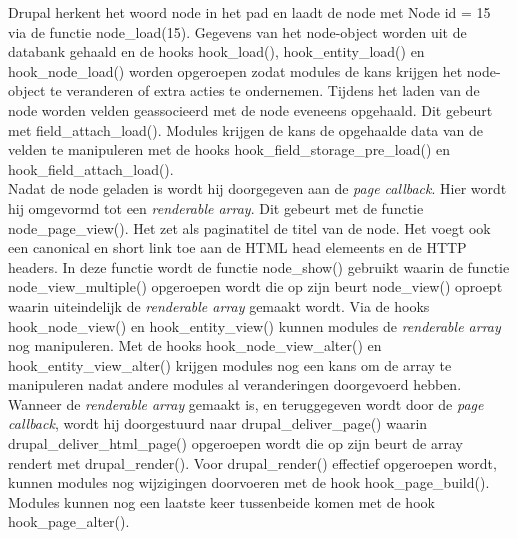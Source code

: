 Drupal herkent het woord node in het pad en laadt de node met Node id = 15 via de functie node\_load(15). Gegevens van het node-object worden uit de databank gehaald en de hooks hook\_load(), hook\_entity\_load() en hook\_node\_load() worden opgeroepen zodat modules de kans krijgen het node-object te veranderen of extra acties te ondernemen. Tijdens het laden van de node worden velden geassocieerd met de node eveneens opgehaald. Dit gebeurt met field\_attach\_load(). Modules krijgen de kans de opgehaalde data van de velden te manipuleren met de hooks hook\_field\_storage\_pre\_load() en hook\_field\_attach\_load().\\

Nadat de node geladen is wordt hij doorgegeven aan de \textit{page callback}. Hier wordt hij omgevormd tot een \textit{renderable array}. Dit gebeurt met de functie node\_page\_view(). Het zet als paginatitel de titel van de node. Het voegt ook een canonical en short link toe aan de HTML head elemeents en de HTTP headers. In deze functie wordt de functie node\_show() gebruikt waarin de functie node\_view\_multiple() opgeroepen wordt die op zijn beurt node\_view() oproept waarin uiteindelijk de \textit{renderable array} gemaakt wordt. Via de hooks hook\_node\_view() en hook\_entity\_view() kunnen modules de \textit{renderable array} nog manipuleren. Met de hooks hook\_node\_view\_alter() en hook\_entity\_view\_alter() krijgen modules nog een kans om de array te manipuleren nadat andere modules al veranderingen doorgevoerd hebben.\\

Wanneer de \textit{renderable array} gemaakt is, en teruggegeven wordt door de \textit{page callback}, wordt hij doorgestuurd naar drupal\_deliver\_page() waarin drupal\_deliver\_html\_page() opgeroepen wordt die op zijn beurt de array rendert met drupal\_render(). Voor drupal\_render() effectief opgeroepen wordt, kunnen modules nog wijzigingen doorvoeren met de hook hook\_page\_build(). Modules kunnen nog een laatste keer tussenbeide komen met de hook hook\_page\_alter().

